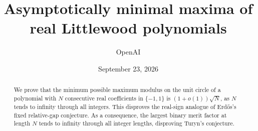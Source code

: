 \documentclass[11pt]{article}
\title{Asymptotically minimal maxima of real Littlewood polynomials}
\author{OpenAI}
\date{September 23, 2026}
\theoremstyle{definition}
\theoremstyle{remark}
\begin{document}
\maketitle
\begin{abstract}
We prove that the minimum possible maximum modulus on the unit circle of a polynomial
with $N$ consecutive real coefficients in $\{-1,1\}$ is $(1+o(1))\sqrt N$,
as $N$ tends to infinity through all integers. This disproves the real-sign
analogue of Erd\H{o}s's fixed relative-gap conjecture. As a consequence,
the largest binary merit factor at length $N$ tends to infinity through all
integer lengths, disproving Turyn's conjecture.
\end{abstract}
\tableofcontents








\appendix



\end{document}
